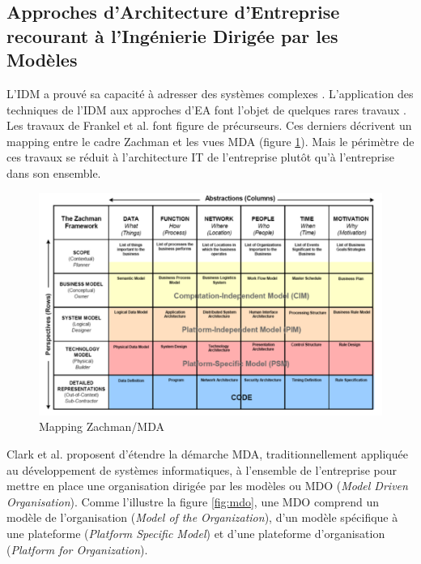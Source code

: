 \subsection{Approches d'Architecture d'Entreprise recourant à l'Ingénierie Dirigée par les Modèles}

L'IDM a prouvé sa capacité à adresser des systèmes complexes \cite{france2007model}. L'application des techniques de l'IDM aux approches d'EA font l'objet de quelques rares travaux \cite{bruneliere2013support}. Les travaux de Frankel et al. \cite{frankel2003zachman} font figure de précurseurs. Ces derniers décrivent un mapping entre le cadre Zachman et les vues MDA (figure \ref{fig:mapping-zachman-mda}). Mais le périmètre de ces travaux se réduit à l'architecture IT de l'entreprise plutôt qu'à l'entreprise dans son ensemble.

\begin{figure}
 \begin{center}
   \includegraphics[width=\textwidth]{images/Chapitre1/mapping_zachman_mda.png}
 \end{center}
 \caption{Mapping Zachman/MDA \protect\cite{frankel2003zachman}}
 \label{fig:mapping-zachman-mda}
\end{figure}

Clark et al. \cite{clark_towards_2014} proposent d'étendre la démarche MDA,  traditionnellement appliquée au développement de systèmes informatiques, à l'ensemble de l'entreprise pour mettre en place une organisation dirigée par les modèles ou MDO (\textit{Model Driven Organisation}). Comme l'illustre la figure \ref{fig:mdo}, une MDO comprend un modèle de l'organisation (\textit{Model of the Organization}), d'un modèle spécifique à une plateforme (\textit{Platform Specific Model}) et d'une plateforme d'organisation (\textit{Platform for Organization}). 

